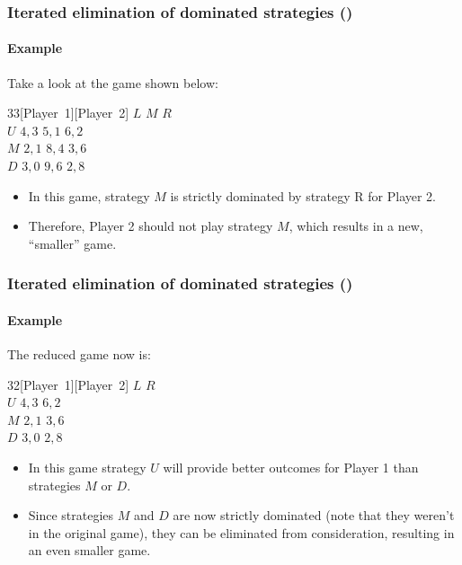 \documentclass[10pt]{beamer}
\theoremstyle{definition}
\begin{document}
\begin{frame}[fragile]
\frametitle{Iterated elimination of dominated strategies ()}
\framesubtitle{Example }
Take a look at the game shown below:
\begin{center}
\begin{game}{3}{3}[Player~1][Player~2]
 \> $ L $ \> $ M $ \> $ R $ \\
$ U $ \> $ 4,3 $ \> $ 5,1 $ \> $ 6,2 $ \\
$ M $ \> $ 2,1 $ \> $ 8,4 $ \> $ 3,6 $ \\
$ D $ \> $ 3,0 $ \> $ 9,6 $ \> $ 2,8 $
\end{game}
\end{center}\bigskip

\begin{itemize}\itemsep1em
\item In this game, strategy $ M $ is strictly dominated by strategy R for Player 2.
\item Therefore, Player 2 should not play strategy $ M $, which results in a new, ``smaller'' game.
\end{itemize}
\end{frame}



\begin{frame}[fragile]
\frametitle{Iterated elimination of dominated strategies ()}
\framesubtitle{Example }
The reduced game now is:
\begin{center}
\begin{game}{3}{2}[Player~1][Player~2]
 \> $ L $ \>  $ R $ \\
$ U $ \> $ 4,3 $ \>  $ 6,2 $ \\
$ M $ \> $ 2,1 $ \>  $ 3,6 $ \\
$ D $ \> $ 3,0 $ \>  $ 2,8 $
\end{game}
\end{center}\bigskip

\begin{itemize}\itemsep1em
\item In this game strategy $ U $ will provide better outcomes for Player 1 than strategies $ M $ or $ D $.
\item Since strategies $ M $ and $ D $ are now strictly dominated (note that they weren't in the original game), they can be eliminated from consideration, resulting in an even smaller game. 
\end{itemize}
\end{frame}
\end{document}
